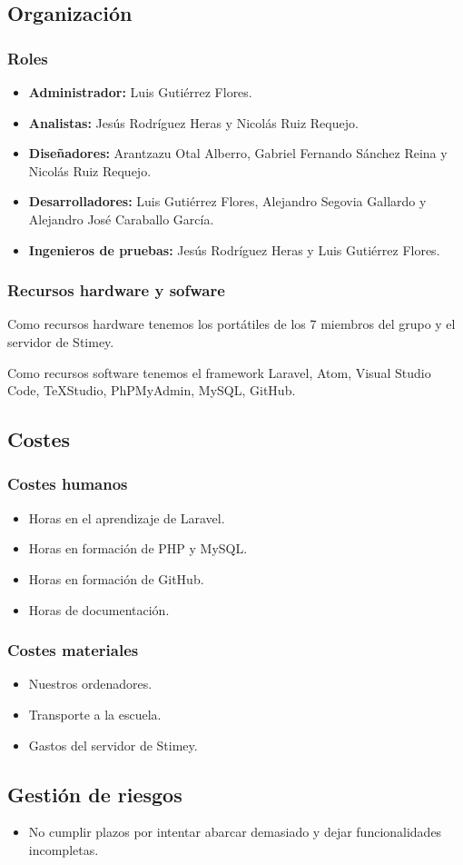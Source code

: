 \documentclass[12pt,letterpaper]{article}
\begin{document}
\subsection{Organización}
\subsubsection{Roles}
\begin{itemize}
	\item \textbf{Administrador:} Luis Gutiérrez Flores.
	\item \textbf{Analistas:} Jesús Rodríguez Heras y Nicolás Ruiz Requejo.
	\item \textbf{Diseñadores:} Arantzazu Otal Alberro, Gabriel Fernando Sánchez Reina y Nicolás Ruiz Requejo.
	\item \textbf{Desarrolladores:} Luis Gutiérrez Flores, Alejandro Segovia Gallardo y Alejandro José Caraballo García.
	\item \textbf{Ingenieros de pruebas:} Jesús Rodríguez Heras y Luis Gutiérrez Flores.
\end{itemize}

\subsubsection{Recursos hardware y sofware}
Como recursos hardware tenemos los portátiles de los 7 miembros del grupo y el servidor de Stimey.

Como recursos software tenemos el framework Laravel, Atom, Visual Studio Code, TeXStudio, PhPMyAdmin, MySQL, GitHub.

\subsection{Costes}
\subsubsection{Costes humanos}
\begin{itemize}
	\item Horas en el aprendizaje de Laravel.
	\item Horas en formación de PHP y MySQL.
	\item Horas en formación de GitHub.
	\item Horas de documentación.
\end{itemize}

\subsubsection{Costes materiales}
\begin{itemize}
	\item Nuestros ordenadores.
	\item Transporte a la escuela.
	\item Gastos del servidor de Stimey.
\end{itemize}

\subsection{Gestión de riesgos}
\begin{itemize}
	\item No cumplir plazos por intentar abarcar demasiado y dejar funcionalidades incompletas.
\end{itemize}
\end{document}
